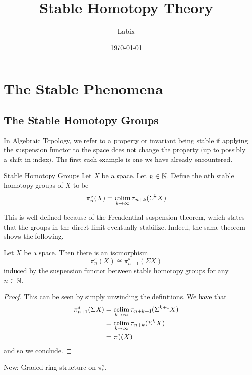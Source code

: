 \documentclass[a4paper]{article}
\title{Stable Homotopy Theory}
\author{Labix}
\date{\today}
\begin{document}
\maketitle
\begin{abstract}
\begin{itemize}
\end{itemize}
\end{abstract}
\pagebreak
\tableofcontents

\pagebreak
\section{The Stable Phenomena}
\subsection{The Stable Homotopy Groups}
In Algebraic Topology, we refer to a property or invariant being stable if applying the suspension functor to the space does not change the property (up to possibly a shift in index). The first such example is one we have already encountered. 

\begin{defn}{Stable Homotopy Groups}{} Let $X$ be a space. Let $n\in\mathbb{N}$. Define the $n$th stable homotopy groups of $X$ to be $$\pi_n^s(X)=\operatorname*{colim}_{k\to\infty}\pi_{n+k}(\Sigma^kX)$$
\end{defn}

This is well defined because of the Freudenthal suspension theorem, which states that the groups in the direct limit eventually stabilize. Indeed, the same theorem shows the following. 

\begin{prp}{}{} Let $X$ be a space. Then there is an isomorphism $$\pi_n^s(X)\cong\pi_{n+1}^s(\Sigma X)$$ induced by the suspension functor between stable homotopy groups for any $n\in\mathbb{N}$. \tcbline
\begin{proof}
This can be seen by simply unwinding the definitions. We have that 
\begin{align*}
\pi_{n+1}^s(\Sigma X)&=\operatorname*{colim}_{k\to\infty}\pi_{n+k+1}(\Sigma^{k+1}X)\\
&=\operatorname*{colim}_{k\to\infty}\pi_{n+k}(\Sigma^kX)\\
&=\pi_n^s(X)
\end{align*}
and so we conclude. 
\end{proof}
\end{prp}

New: Graded ring structure on $\pi_\ast^s$. \\
\end{document}
